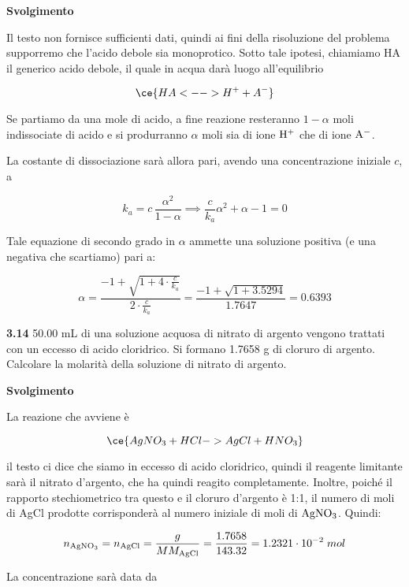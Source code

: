 \vspace{0.2cm}\large\textbf{Svolgimento}\normalsize

\vspace{0.2cm}Il testo non fornisce sufficienti dati, quindi ai fini della risoluzione del problema supporremo che l'acido debole sia monoprotico. Sotto tale ipotesi, chiamiamo HA il generico acido debole, il quale in acqua darà luogo all'equilibrio

$$\ce{HA <--> H^+ + A^-}$$

Se partiamo da una mole di acido, a fine reazione resteranno $1 - \alpha$ moli indissociate di acido e si produrranno $\alpha$ moli sia di ione $\rm H^+$ che di ione $\rm A^-$. 

La costante di dissociazione sarà allora pari, avendo una concentrazione iniziale $c$, a

$$k_a=c\,\frac{\alpha^2}{1-\alpha}
\implies
\frac{c}{k_a}\alpha^2 + \alpha -1=0$$

Tale equazione di secondo grado in $\alpha$ ammette una soluzione positiva (e una negativa che scartiamo) pari a:

$$\alpha=\frac{-1 + \sqrt{1 + 4 \cdot \displaystyle \frac{c}{k_a}}}{2 \cdot \displaystyle \frac{c}{k_a}}
=\frac{-1 + \sqrt{1 + 3.5294}}{1.7647}=0.6393$$

\vspace{0.2cm}\textbf{3.14} 50.00 mL di una soluzione acquosa di nitrato di argento vengono trattati con un eccesso di acido
cloridrico. Si formano 1.7658 g di cloruro di argento. Calcolare la molarità della soluzione di nitrato
di argento.

\vspace{0.2cm}\large\textbf{Svolgimento}\normalsize

\vspace{0.2cm}La reazione che avviene è

$$\ce{AgNO_3 + HCl -> AgCl + HNO_3}$$

il testo ci dice che siamo in eccesso di acido cloridrico, quindi il reagente limitante sarà il nitrato d'argento, che ha quindi reagito completamente. Inoltre, poiché il rapporto stechiometrico tra questo e il cloruro d'argento è 1:1, il numero di moli di AgCl prodotte corrisponderà al numero iniziale di moli di $\rm AgNO_3$. Quindi:

$$n_{\rm AgNO_3}=n_{\rm AgCl}=\frac{g}{MM_{\rm AgCl}}
=\frac{1.7658}{143.32}=1.2321 \cdot 10^{-2}\;mol$$

La concentrazione sarà data da

